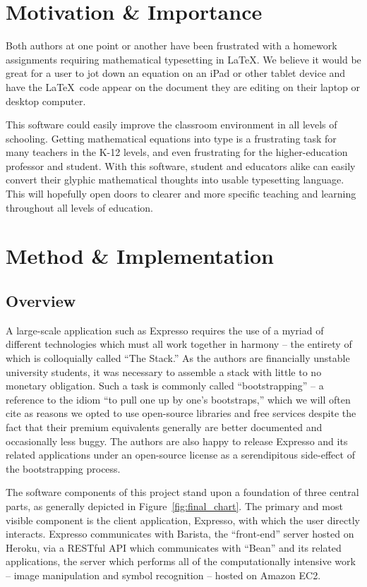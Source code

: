 \documentclass{acm_proc_article-sp}
\begin{document}
\section{Motivation \& Importance}
Both authors at one point or another have been frustrated with a homework assignments requiring mathematical typesetting in \LaTeX{}.  We believe it would be great for a user to jot down an equation on an iPad or other tablet device and have the \LaTeX{}\ code appear on the document they are editing on their laptop or desktop computer.

This software could easily improve the classroom environment in all levels of schooling. Getting mathematical equations into type is a frustrating task for many teachers in the K-12 levels, and even frustrating for the higher-education professor and student. With this software, student and educators alike can easily convert their glyphic mathematical thoughts into usable typesetting language. This will hopefully open doors to clearer and more specific teaching and learning throughout all levels of education.

\section{Method \& Implementation}

\subsection{Overview}
A large-scale application such as Expresso requires the use of a myriad of different technologies which must all work together in harmony --
the entirety of which is colloquially called ``The Stack.'' As the authors are financially unstable university students, it was necessary to
assemble a stack with little to no monetary obligation. Such a task is commonly called ``bootstrapping'' -- a reference to the idiom ``to pull one up by one's bootstraps,'' which we will often cite as reasons we opted to use open-source libraries and free services despite the fact that their premium equivalents generally are better documented and occasionally less buggy. The authors are also happy to release Expresso and its related applications under an open-source license as a serendipitous side-effect of the bootstrapping process.

The software components of this project stand upon a foundation of three central parts, as generally depicted in Figure~\ref{fig:final_chart}. The primary and most visible component is the client application, Expresso, with which the user directly interacts. Expresso communicates with Barista, the ``front-end'' server hosted on Heroku, via a RESTful API which communicates with ``Bean'' and its related applications, the server which performs all of the computationally intensive work -- image manipulation and symbol recognition -- hosted on Amazon EC2.
\end{document}
